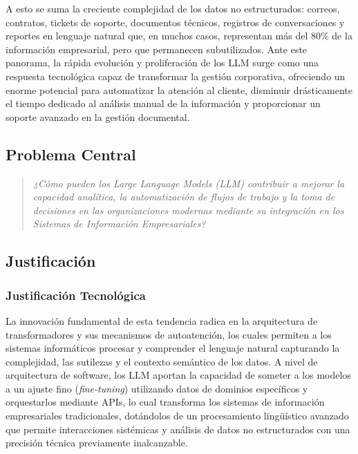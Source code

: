 \documentclass[12pt,a4paper,oneside]{article}
\begin{document}
A esto se suma la creciente complejidad de los datos no estructurados: correos, contratos, tickets de soporte, documentos técnicos, registros de conversaciones y reportes en lenguaje natural que, en muchos casos, representan más del 80\% de la información empresarial, pero que permanecen subutilizados. Ante este panorama, la rápida evolución y proliferación de los LLM surge como una respuesta tecnológica capaz de transformar la gestión corporativa, ofreciendo un enorme potencial para automatizar la atención al cliente, disminuir drásticamente el tiempo dedicado al análisis manual de la información y proporcionar un soporte avanzado en la gestión documental.

\subsection{Problema Central}

\begin{quote}
\textit{¿Cómo pueden los Large Language Models (LLM) contribuir a mejorar la capacidad analítica, la automatización de flujos de trabajo y la toma de decisiones en las organizaciones modernas mediante su integración en los Sistemas de Información Empresariales?}
\end{quote}

\subsection{Justificación}

\subsubsection{Justificación Tecnológica}

La innovación fundamental de esta tendencia radica en la arquitectura de transformadores y sus mecanismos de autoatención, los cuales permiten a los sistemas informáticos procesar y comprender el lenguaje natural capturando la complejidad, las sutilezas y el contexto semántico de los datos. A nivel de arquitectura de software, los LLM aportan la capacidad de someter a los modelos a un ajuste fino (\textit{fine-tuning}) utilizando datos de dominios específicos y orquestarlos mediante APIs, lo cual transforma los sistemas de información empresariales tradicionales, dotándolos de un procesamiento lingüístico avanzado que permite interacciones sistémicas y análisis de datos no estructurados con una precisión técnica previamente inalcanzable.
\end{document}
